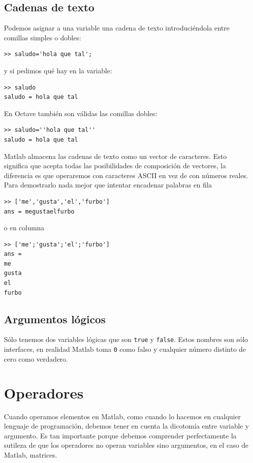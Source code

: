 \subsection{Cadenas de texto}

Podemos asignar a una variable una cadena de texto introduciéndola
entre comillas simples o dobles:

\begin{lstlisting}
>> saludo='hola que tal';
\end{lstlisting}
y si pedimos qué hay en la variable:

\begin{lstlisting}
>> saludo
saludo = hola que tal
\end{lstlisting}
En Octave también son válidas las comillas dobles:

\begin{lstlisting}
>> saludo=''hola que tal''
saludo = hola que tal
\end{lstlisting}
Matlab almacena las cadenas de texto como un vector de caracteres.
Esto significa que acepta todas las posibilidades de composición de
vectores, la diferencia es que operaremos con caracteres ASCII en vez
de con números reales. Para demostrarlo nada mejor que intentar
encadenar palabras en fila

\begin{lstlisting}
>> ['me','gusta','el','furbo']
ans = megustaelfurbo
\end{lstlisting}
o en columna

\begin{lstlisting}
>> ['me';'gusta';'el';'furbo']
ans =
me
gusta
el
furbo
\end{lstlisting}

\subsection{Argumentos lógicos}

Sólo tenemos dos variables lógicas que son \texttt{true} y
\texttt{false}.  Estos nombres son sólo interfaces, en realidad Matlab
toma \texttt{0} como falso y cualquier número distinto de cero como verdadero.


\section{Operadores}

Cuando operamos elementos en Matlab, como cuando lo hacemos en
cualquier lenguaje de programación, debemos tener en cuenta la
dicotomía entre variable y argumento. Es tan importante porque debemos
comprender perfectamente la sutileza de que los operadores no operan
variables sino argumentos, en el caso de Matlab, matrices.

